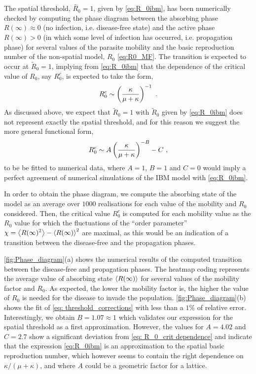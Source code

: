 The spatial threshold, $\tilde{R_0}=1$, given by \cref{eq:R_0ibm}, has been
numerically checked by computing the phase diagram between the absorbing phase
$R(\infty)\approx 0$ (no infection, i.e. disease-free state)  and the active
phase $R(\infty)> 0$ (in which some level of infection has occurred, i.e.
propagation phase) for several values of the parasite mobility and the basic
reproduction number of the non-spatial model, $R_0$ \cref{eq:R0_MF}. The
transition is expected to occur at $\tilde{R}_0=1$, implying from
\cref{eq:R_0ibm} that the dependence of the critical value of $R_0$, say
$R_0^c$, is expected to take the form,
\begin{equation}\label{eq: R_0_crit dependence}
    R_0^c\sim\left(\frac{\kappa}{\mu+\kappa}\right)^{-1} \ .
\end{equation}
As discussed above, we expect that $\tilde{R}_0=1$ with $\tilde{R}_0$ given
by \cref{eq:R_0ibm} does not represent exactly the spatial threshold, and for
this reason we suggest the more general functional form,
\begin{equation}\label{eq: threshold_corrections}
    R_0^c\sim A\parentesi{\frac{\kappa}{\mu+\kappa}}^{-B} - C\ ,
\end{equation}
to be be fitted to numerical data, where $A=1$, $B=1$ and $C=0$ would imply
a perfect agreement of numerical simulations of the IBM model with
\cref{eq:R_0ibm}.

In order to obtain the phase diagram, we compute the absorbing state of the
model as an average over $1000$ realisations for each value of the mobility and
$R_0$ considered. Then, the critical value $R_0^c$ is computed for each
mobility value as the $R_0$ value for which the fluctuations of the ``order
parameter'' $\displaystyle \chi=\left<{R(\infty})^2\right>-\left<R(\infty)\right>^2$ are
maximal, as this would be an indication of a transition between the
disease-free and the propagation phases.

\cref{fig:Phase_diagram}(a) shows the numerical results of the computed
transition between the disease-free and propagation phases. The heatmap coding
represents the average value of absorbing state $\left<R(\infty)\right>$ for several
values of the mobility factor and $R_0$. As expected, the lower the mobility
factor is, the higher the value of $R_0$ is needed for the disease to invade
the population. \cref{fig:Phase_diagram}(b) shows the fit of \cref{eq:
    threshold_corrections} with less than a $1\%$ of relative error.
Interestingly,
we obtain $B=1.07\approx1$ which validates our expression for the spatial
threshold as a first approximation. However, the values for $A=4.02$ and
$C=2.7$ show a significant deviation from \cref{eq: R_0_crit dependence} and
indicate that the expression \cref{eq:R_0ibm} is  an approximation to the
spatial basic reproduction number, which however seems to contain the right
dependence on $\kappa/(\mu+\kappa)$, and where $A$ could be a geometric factor
for a lattice.

